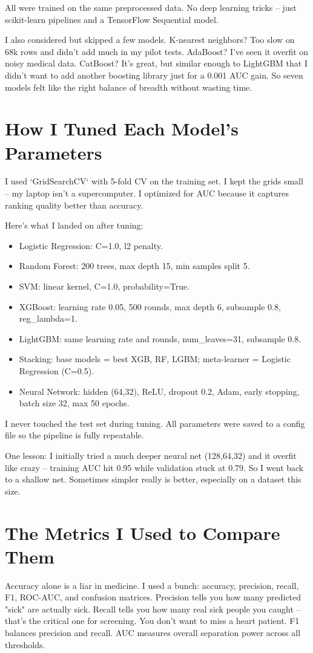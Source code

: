 \documentclass[12pt, a4paper, oneside]{book}
\begin{document}
All were trained on the same preprocessed data. No deep learning tricks – just scikit-learn pipelines and a TensorFlow Sequential model.

I also considered but skipped a few models. K-nearest neighbors? Too slow on 68k rows and didn't add much in my pilot tests. AdaBoost? I've seen it overfit on noisy medical data. CatBoost? It's great, but similar enough to LightGBM that I didn't want to add another boosting library just for a 0.001 AUC gain. So seven models felt like the right balance of breadth without wasting time.

\section{How I Tuned Each Model's Parameters}
I used `GridSearchCV` with 5-fold CV on the training set. I kept the grids small – my laptop isn't a supercomputer. I optimized for AUC because it captures ranking quality better than accuracy.

Here's what I landed on after tuning:

\begin{itemize}
  \item Logistic Regression: C=1.0, l2 penalty.
  \item Random Forest: 200 trees, max depth 15, min samples split 5.
  \item SVM: linear kernel, C=1.0, probability=True.
  \item XGBoost: learning rate 0.05, 500 rounds, max depth 6, subsample 0.8, reg\_lambda=1.
  \item LightGBM: same learning rate and rounds, num\_leaves=31, subsample 0.8.
  \item Stacking: base models = best XGB, RF, LGBM; meta-learner = Logistic Regression (C=0.5).
  \item Neural Network: hidden (64,32), ReLU, dropout 0.2, Adam, early stopping, batch size 32, max 50 epochs.
\end{itemize}

I never touched the test set during tuning. All parameters were saved to a config file so the pipeline is fully repeatable.

One lesson: I initially tried a much deeper neural net (128,64,32) and it overfit like crazy – training AUC hit 0.95 while validation stuck at 0.79. So I went back to a shallow net. Sometimes simpler really is better, especially on a dataset this size.

\section{The Metrics I Used to Compare Them}
Accuracy alone is a liar in medicine. I used a bunch: accuracy, precision, recall, F1, ROC-AUC, and confusion matrices. Precision tells you how many predicted "sick" are actually sick. Recall tells you how many real sick people you caught – that's the critical one for screening. You don't want to miss a heart patient. F1 balances precision and recall. AUC measures overall separation power across all thresholds.
\end{document}
